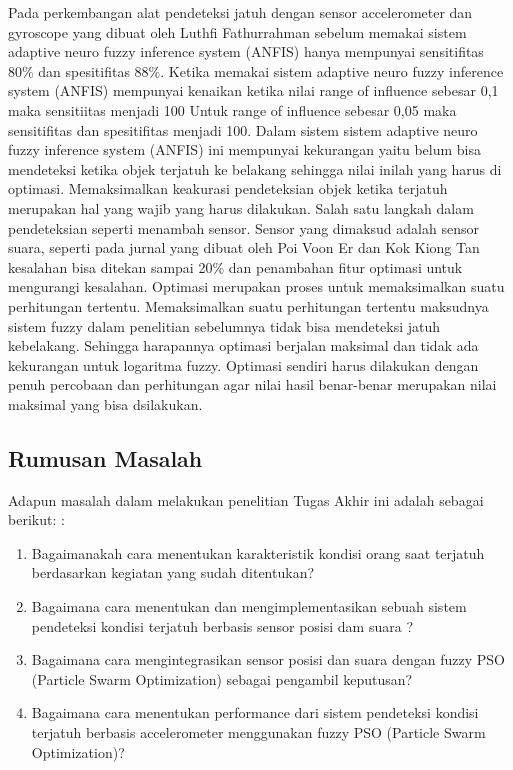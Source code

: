 \documentclass[11pt]{article}
\begin{document}
	Pada perkembangan alat pendeteksi jatuh dengan sensor accelerometer dan gyroscope  yang dibuat oleh Luthfi Fathurrahman sebelum memakai sistem adaptive neuro fuzzy inference system (ANFIS) hanya mempunyai sensitifitas  80\% dan spesitifitas 88\%.
	Ketika memakai sistem adaptive neuro fuzzy inference system (ANFIS) mempunyai kenaikan ketika nilai range of influence sebesar 0,1  maka sensitiitas menjadi 100%
	Untuk range of influence sebesar 0,05  maka sensitifitas dan spesitifitas  menjadi 100.
	Dalam sistem sistem adaptive neuro fuzzy inference system (ANFIS) ini  mempunyai kekurangan yaitu belum bisa mendeteksi ketika objek terjatuh ke belakang sehingga nilai inilah yang harus di optimasi.
	Memaksimalkan keakurasi pendeteksian objek ketika terjatuh merupakan hal yang wajib yang harus dilakukan.
	Salah satu langkah dalam pendeteksian seperti menambah sensor.
	Sensor yang dimaksud adalah sensor suara, seperti pada jurnal yang dibuat oleh  Poi Voon Er dan Kok Kiong Tan kesalahan bisa ditekan sampai 20\% dan penambahan fitur optimasi untuk mengurangi kesalahan.
	Optimasi merupakan proses untuk memaksimalkan suatu perhitungan tertentu.
	Memaksimalkan suatu perhitungan tertentu maksudnya sistem fuzzy dalam penelitian sebelumnya tidak bisa mendeteksi jatuh kebelakang.
	Sehingga harapannya optimasi berjalan maksimal dan tidak ada kekurangan untuk logaritma fuzzy.
	Optimasi sendiri harus dilakukan dengan penuh percobaan dan perhitungan agar nilai hasil benar-benar merupakan nilai maksimal yang bisa dsilakukan.		
	
	\subsection{Rumusan Masalah}
	
		Adapun masalah dalam melakukan penelitian Tugas Akhir ini adalah sebagai berikut: :
	
	\begin{enumerate}[label=\alph*.]
		\item Bagaimanakah cara menentukan karakteristik kondisi orang saat terjatuh berdasarkan kegiatan yang sudah ditentukan?
		\item Bagaimana cara menentukan dan mengimplementasikan sebuah sistem pendeteksi kondisi terjatuh berbasis sensor posisi dam suara ?
		\item Bagaimana cara mengintegrasikan sensor posisi dan suara dengan fuzzy PSO (Particle Swarm Optimization) sebagai pengambil keputusan?
		\item Bagaimana cara menentukan performance dari sistem pendeteksi kondisi terjatuh berbasis accelerometer menggunakan fuzzy PSO (Particle Swarm Optimization)?
	
	\end{enumerate}
	
\end{document}
